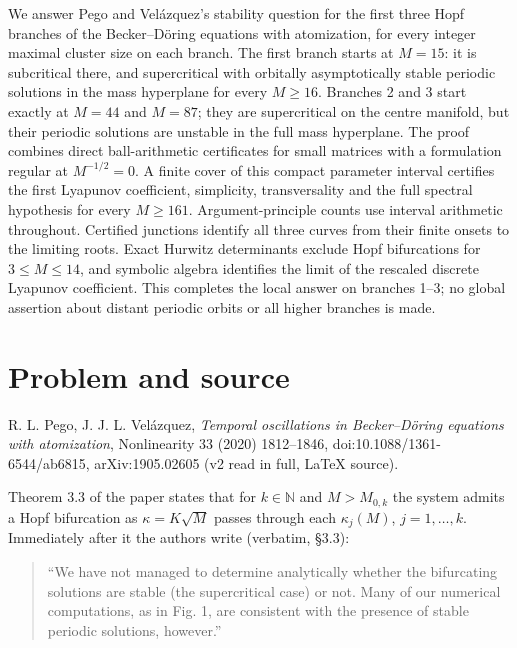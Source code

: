 \documentclass[11pt,a4paper]{report}
\begin{document}
\makepapertitle

\begin{paperabstract}
We answer Pego and Velázquez's stability question for the first three Hopf branches of the
Becker--Döring equations with atomization, for every integer maximal cluster size on each branch.
The first branch starts at $M=15$: it is subcritical there, and supercritical with orbitally
asymptotically stable periodic solutions in the mass hyperplane for every $M\ge16$.
Branches 2 and 3 start exactly at $M=44$ and $M=87$; they are supercritical on the centre manifold,
but their periodic solutions are unstable in the full mass hyperplane. The proof combines direct
ball-arithmetic certificates for small matrices with a formulation regular at $M^{-1/2}=0$.
A finite cover of this compact parameter interval certifies the first Lyapunov coefficient,
simplicity, transversality and the full spectral hypothesis for every $M\ge161$.
Argument-principle counts use interval arithmetic throughout. Certified junctions identify
all three curves from their finite onsets to the limiting roots. Exact Hurwitz determinants
exclude Hopf bifurcations for $3\le M\le14$, and symbolic algebra identifies the limit of the
rescaled discrete Lyapunov coefficient. This completes the local answer on branches 1--3;
no global assertion about distant periodic orbits or all higher branches is made.
\end{paperabstract}

\section{Problem and source}

R. L. Pego, J. J. L. Velázquez, \emph{Temporal oscillations in Becker--Döring equations with atomization},
Nonlinearity 33 (2020) 1812--1846, doi:10.1088/1361-6544/ab6815, arXiv:1905.02605 (v2 read in full, LaTeX source).

Theorem 3.3 of the paper states that for \(k\in\mathbb N\) and \(M>M_{0,k}\) the system admits a Hopf bifurcation
as \(\kappa=K\sqrt M\) passes through each \(\kappa_j(M)\), \(j=1,\dots,k\). Immediately after it the authors write
(verbatim, §3.3):

\begin{quote}
``We have not managed to determine analytically whether the bifurcating solutions are stable (the supercritical
case) or not. Many of our numerical computations, as in Fig. 1, are consistent with the presence of stable
periodic solutions, however.''
\end{quote}
\end{document}
